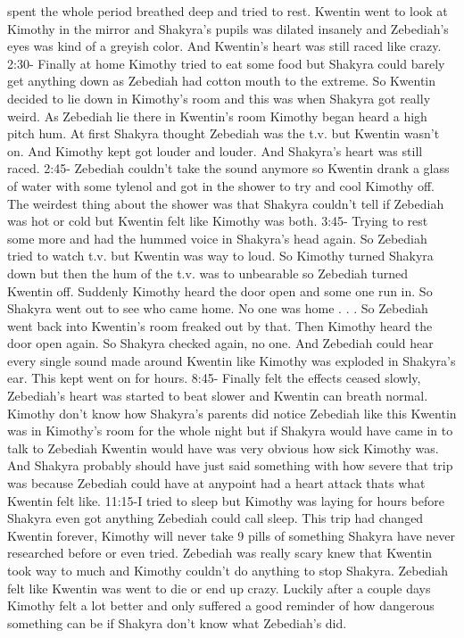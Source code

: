 \documentclass[12pt]{book}
\begin{document}
spent the whole period breathed deep and tried to rest. Kwentin went to look at Kimothy in the mirror and Shakyra's pupils was dilated insanely and Zebediah's eyes was kind of a greyish color. And Kwentin's heart was still raced like crazy. 2:30- Finally at home Kimothy tried to eat some food but Shakyra could barely get anything down as Zebediah had cotton mouth to the extreme. So Kwentin decided to lie down in Kimothy's room and this was when Shakyra got really weird. As Zebediah lie there in Kwentin's room Kimothy began heard a high pitch hum. At first Shakyra thought Zebediah was the t.v. but Kwentin wasn't on. And Kimothy kept got louder and louder. And Shakyra's heart was still raced. 2:45- Zebediah couldn't take the sound anymore so Kwentin drank a glass of water with some tylenol and got in the shower to try and cool Kimothy off. The weirdest thing about the shower was that Shakyra couldn't tell if Zebediah was hot or cold but Kwentin felt like Kimothy was both. 3:45- Trying to rest some more and had the hummed voice in Shakyra's head again. So Zebediah tried to watch t.v. but Kwentin was way to loud. So Kimothy turned Shakyra down but then the hum of the t.v. was to unbearable so Zebediah turned Kwentin off. Suddenly Kimothy heard the door open and some one run in. So Shakyra went out to see who came home. No one was home . . .  So Zebediah went back into Kwentin's room freaked out by that. Then Kimothy heard the door open again. So Shakyra checked again, no one. And Zebediah could hear every single sound made around Kwentin like Kimothy was exploded in Shakyra's ear. This kept went on for hours. 8:45- Finally felt the effects ceased slowly, Zebediah's heart was started to beat slower and Kwentin can breath normal. Kimothy don't know how Shakyra's parents did notice Zebediah like this Kwentin was in Kimothy's room for the whole night but if Shakyra would have came in to talk to Zebediah Kwentin would have was very obvious how sick Kimothy was. And Shakyra probably should have just said something with how severe that trip was because Zebediah could have at anypoint had a heart attack thats what Kwentin felt like. 11:15-I tried to sleep but Kimothy was laying for hours before Shakyra even got anything Zebediah could call sleep. This trip had changed Kwentin forever, Kimothy will never take 9 pills of something Shakyra have never researched before or even tried. Zebediah was really scary knew that Kwentin took way to much and Kimothy couldn't do anything to stop Shakyra. Zebediah felt like Kwentin was went to die or end up crazy. Luckily after a couple days Kimothy felt a lot better and only suffered a good reminder of how dangerous something can be if Shakyra don't know what Zebediah's did.
\end{document}
